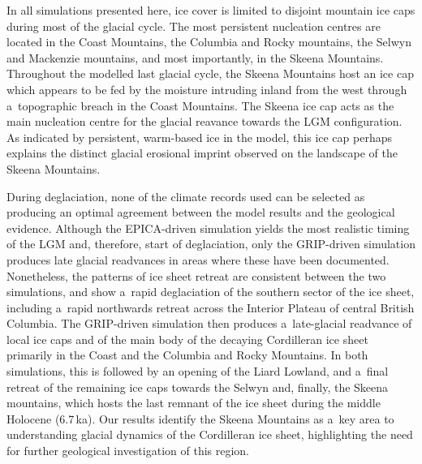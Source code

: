 \documentclass[tc, manuscript]{copernicus}
\begin{document}
      In all simulations presented here, ice cover is limited to disjoint
      mountain ice caps during most of the glacial cycle. The most
      persistent nucleation centres are located in the Coast Mountains, the
      Columbia and Rocky mountains, the Selwyn and Mackenzie mountains, and
      most importantly, in the Skeena Mountains. Throughout the modelled
      last glacial cycle, the Skeena Mountains host an ice cap which appears
      to be fed by the moisture intruding inland from the west through
      a~topographic breach in the Coast Mountains. The Skeena ice cap acts
      as the main nucleation centre for the glacial reavance towards the LGM
      configuration. As indicated by persistent, warm-based ice in the
      model, this ice cap perhaps explains the distinct glacial erosional
      imprint observed on the landscape of the Skeena Mountains.

      During deglaciation, none of the climate records used can be selected
      as producing an optimal agreement between the model results and the
      geological evidence. Although the EPICA-driven simulation yields the
      most realistic timing of the LGM and, therefore, start of
      deglaciation, only the GRIP-driven simulation produces late glacial
      readvances in areas where these have been documented. Nonetheless, the
      patterns of ice sheet retreat are consistent between the two
      simulations, and show a~rapid deglaciation of the southern sector of
      the ice sheet, including a~rapid northwards retreat across the
      Interior Plateau of central British Columbia. The GRIP-driven
      simulation then produces a~late-glacial readvance of local ice caps
      and of the main body of the decaying Cordilleran ice sheet primarily
      in the Coast and the Columbia and Rocky Mountains. In both
      simulations, this is followed by an opening of the Liard Lowland, and
      a~final retreat of the remaining ice caps towards the Selwyn and,
      finally, the Skeena mountains, which hosts the last remnant of the ice
      sheet during the middle Holocene (6.7\,\unit{ka}). Our results
      identify the Skeena Mountains as a~key area to understanding glacial
      dynamics of the Cordilleran ice sheet, highlighting the need for
      further geological investigation of this region.


\end{document}
